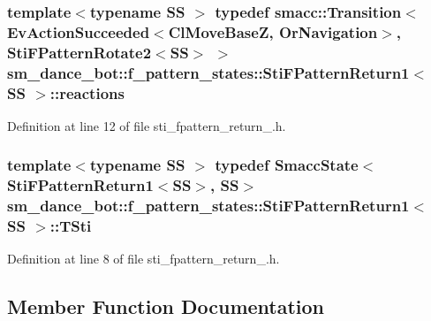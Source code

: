 \subsubsection[{\texorpdfstring{reactions}{reactions}}]{\setlength{\rightskip}{0pt plus 5cm}template$<$typename SS $>$ typedef {\bf smacc\+::\+Transition}$<$Ev\+Action\+Succeeded$<${\bf Cl\+Move\+BaseZ}, {\bf Or\+Navigation}$>$, {\bf Sti\+F\+Pattern\+Rotate2}$<$SS$>$ $>$ {\bf sm\+\_\+dance\+\_\+bot\+::f\+\_\+pattern\+\_\+states\+::\+Sti\+F\+Pattern\+Return1}$<$ SS $>$\+::{\bf reactions}}\hypertarget{structsm__dance__bot_1_1f__pattern__states_1_1StiFPatternReturn1_a6d7ebf9aae079085114a9c018a78d19a}{}\label{structsm__dance__bot_1_1f__pattern__states_1_1StiFPatternReturn1_a6d7ebf9aae079085114a9c018a78d19a}


Definition at line 12 of file sti\+\_\+fpattern\+\_\+return\+\_.\+h.

\subsubsection[{\texorpdfstring{T\+Sti}{TSti}}]{\setlength{\rightskip}{0pt plus 5cm}template$<$typename SS $>$ typedef {\bf Smacc\+State}$<${\bf Sti\+F\+Pattern\+Return1}$<$SS$>$, SS$>$ {\bf sm\+\_\+dance\+\_\+bot\+::f\+\_\+pattern\+\_\+states\+::\+Sti\+F\+Pattern\+Return1}$<$ SS $>$\+::{\bf T\+Sti}}\hypertarget{structsm__dance__bot_1_1f__pattern__states_1_1StiFPatternReturn1_afd0d5d7e8dc6ad87f7314176d86d919e}{}\label{structsm__dance__bot_1_1f__pattern__states_1_1StiFPatternReturn1_afd0d5d7e8dc6ad87f7314176d86d919e}


Definition at line 8 of file sti\+\_\+fpattern\+\_\+return\+\_.\+h.



\subsection{Member Function Documentation}
